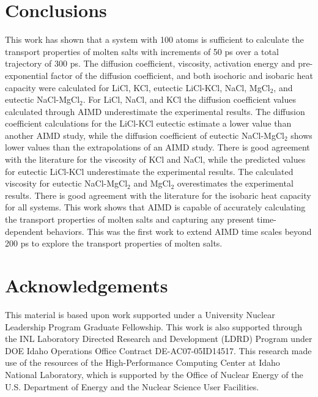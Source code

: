 \documentclass[review]{elsarticle}
\begin{document}
\FloatBarrier
\section{Conclusions}
This work has shown that a system with 100 atoms is sufficient to calculate the transport properties of molten salts with increments of 50 ps over a total trajectory of 300 ps. The diffusion coefficient, viscosity, activation energy and pre-exponential factor of the diffusion coefficient, and both isochoric and isobaric heat capacity were calculated for LiCl, KCl, eutectic LiCl-KCl, NaCl, MgCl$_2$, and eutectic NaCl-MgCl$_2$. For LiCl, NaCl, and KCl the diffusion coefficient values calculated through AIMD underestimate the experimental results. The diffusion coefficient calculations for the LiCl-KCl eutectic estimate a lower value than another AIMD study, while the diffusion coefficient of eutectic NaCl-MgCl$_2$ shows lower values than the extrapolations of an AIMD study. There is good agreement with the literature for the viscosity of KCl and NaCl, while the predicted values for eutectic LiCl-KCl underestimate the experimental results. The calculated viscosity for eutectic NaCl-MgCl$_2$ and MgCl$_2$ overestimates the experimental results. There is good agreement with the literature for the isobaric heat capacity for all systems. This work shows that AIMD is capable of accurately calculating the transport properties of molten salts and capturing any present time-dependent behaviors. This was the first work to extend AIMD time scales beyond 200 ps to explore the transport properties of molten salts.

\section{Acknowledgements}

This material is based upon work supported under a University Nuclear Leadership Program Graduate Fellowship. This work is also supported through the INL Laboratory Directed Research and Development (LDRD) Program under DOE Idaho Operations Office Contract DE-AC07-05ID14517. This research made use of the resources of the High-Performance Computing Center at Idaho National Laboratory, which is supported by the Office of Nuclear Energy of the U.S. Department of Energy and the Nuclear Science User Facilities.  
\FloatBarrier

\appendix

\section{}
\end{document}
